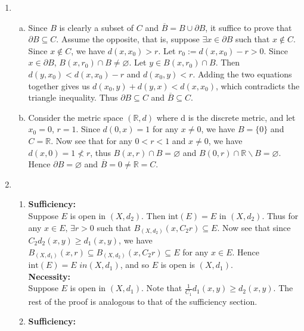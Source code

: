 \documentclass[A4paper,12pt]{article}
\theoremstyle{definition}
\numberwithin{equation}{section}
\begin{document}
\begin{enumerate}[(1)]
    \item
        \begin{enumerate}[(a)]
            \item
                Since $B$ is clearly a subset of $C$ and $\overline{B} = B \cup \partial B$, it suffice to prove that $\partial B \subseteq C$.
                Assume the opposite, that is, suppose $\exists x \in \partial B$ such that $x \not \in C$. Since $x \not \in C$, we have $d(x,x_0) > r$.
                Let $r_0 := d(x,x_0) - r > 0$. Since $x \in \partial B$, $B(x, r_0) \cap B  \not = \varnothing$. 
                Let $y \in B(x, r_0) \cap B$. Then $d(y, x_0) < d(x, x_0) - r$ and $d(x_0, y)< r$. Adding the two equations together gives us $d(x_0, y) + d(y, x) < d(x, x_0)$, which contradicts the triangle inequality. Thus $\partial B \subseteq C$ and $\overline{B} \subseteq C$.
            \item
                Consider the metric space $(\mathbb{R}, d)$ where d is the discrete metric, and let $x_0 = 0$, $r = 1$. 
                Since $d(0, x) = 1$ for any $x \not = 0$, we have $B = \{0\}$ and $C = \mathbb{R}$.
                Now see that for any $0< r < 1$ and $x \not = 0$, we have $d(x, 0) = 1 \not < r$, thus $B(x, r) \cap B = \varnothing$ and $B(0, r)\cap \mathbb{R} \backslash B = \varnothing$. Hence $\partial B = \varnothing$ and $\overline{B} = {0} \not = \mathbb{R} = C$.
        \end{enumerate}
    \item
        \begin{enumerate}
            \item
                \textbf{Sufficiency:}\\
                Suppose $E$ is open in $(X, d_{2})$. Then $\mathrm{int}(E) = E$ in $(X, d_{2})$. Thus for any $x \in E,\, \exists r>0$ such that $B_{(X,d_{2})}(x, C_2 r) \subseteq E$. 
                Now see that since $C_2d_2(x,y) \ge d_1(x,y)$, we have $B_{(X,d_1)}(x, r) \subseteq B_{(X, d_2)}(x, C_2r) \subseteq E$ for any $x \in E$. Hence $\mathrm{int}(E) = E$ $in (X, d_{1})$, and so $E$ is open is $(X, d_1).$
                \\
                \textbf{Necessity: }\\
                Suppose $E$ is open in $(X, d_1)$. Note that $\frac{1}{C_1}d_1(x,y) \ge d_2(x,y)$. The rest of the proof is analogous to that of the sufficiency section.
            \item
                \textbf{Sufficiency:}\\

\end{enumerate}
\end{enumerate}
\end{document}
